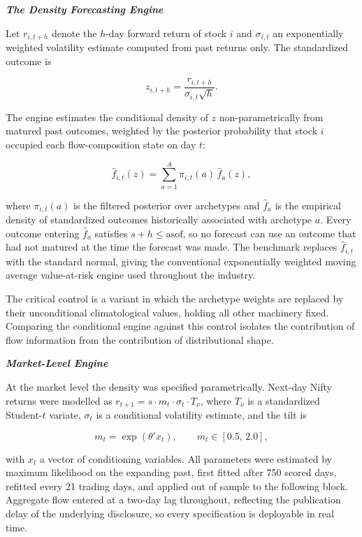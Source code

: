 \documentclass[12pt]{article}
\begin{document}
\textbf{\emph{The Density Forecasting Engine}}

Let $r_{i,t+h}$ denote the $h$-day forward return of stock $i$ and
$\sigma_{i,t}$ an exponentially weighted volatility estimate computed from
past returns only. The standardized outcome is

\begin{equation}
z_{i,t+h} = \frac{r_{i,t+h}}{\sigma_{i,t}\sqrt{h}}.
\end{equation}

The engine estimates the conditional density of $z$ non-parametrically from
matured past outcomes, weighted by the posterior probability that stock $i$
occupied each flow-composition state on day $t$:

\begin{equation}
\hat{f}_{i,t}(z) = \sum_{a=1}^{A} \pi_{i,t}(a)\, \hat{f}_a(z),
\end{equation}

where $\pi_{i,t}(a)$ is the filtered posterior over archetypes and
$\hat{f}_a$ is the empirical density of standardized outcomes historically
associated with archetype $a$. Every outcome entering $\hat{f}_a$ satisfies
$s + h \le \mathrm{asof}$, so no forecast can use an outcome that had not
matured at the time the forecast was made. The benchmark replaces
$\hat{f}_{i,t}$ with the standard normal, giving the conventional
exponentially weighted moving average value-at-risk engine used throughout the
industry.

The critical control is a variant in which the archetype weights are replaced
by their unconditional climatological values, holding all other machinery
fixed. Comparing the conditional engine against this control isolates the
contribution of flow information from the contribution of distributional
shape.

\textbf{\emph{Market-Level Engine}}

At the market level the density was specified parametrically. Next-day Nifty
returns were modelled as $r_{t+1} = s \cdot m_t \cdot \sigma_t \cdot T_\nu$,
where $T_\nu$ is a standardized Student-$t$ variate, $\sigma_t$ is a
conditional volatility estimate, and the tilt is

\begin{equation}
m_t = \exp(\theta' x_t), \qquad m_t \in [0.5,\, 2.0],
\end{equation}

with $x_t$ a vector of conditioning variables. All parameters were estimated
by maximum likelihood on the expanding past, first fitted after 750 scored
days, refitted every 21 trading days, and applied out of sample to the
following block. Aggregate flow entered at a two-day lag throughout,
reflecting the publication delay of the underlying disclosure, so every
specification is deployable in real time.
\end{document}
